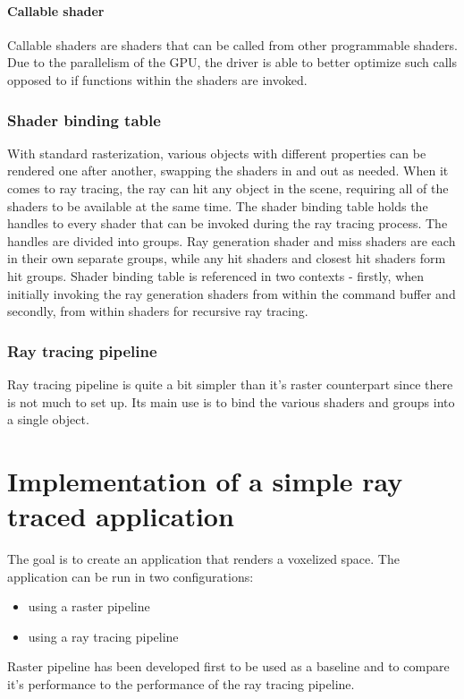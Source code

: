 \documentclass[times, utf8, zavrsni, numeric]{fer}
\begin{document}
\subsubsection{Callable shader}
Callable shaders are shaders that can be called from other programmable shaders. Due to the parallelism of the GPU, the driver is able to better optimize such calls opposed to if functions within the shaders are invoked.

\subsection{Shader binding table}
With standard rasterization, various objects with different properties can be rendered one after another, swapping the shaders in and out as needed. When it comes to ray tracing, the ray can hit any object in the scene, requiring all of the shaders to be available at the same time. The shader binding table holds the handles to every shader that can be invoked during the ray tracing process. The handles are divided into groups. Ray generation shader and miss shaders are each in their own separate groups, while any hit shaders and closest hit shaders form hit groups. Shader binding table is referenced in two contexts - firstly, when initially invoking the ray generation shaders from within the command buffer and secondly, from within shaders for recursive ray tracing.

\subsection{Ray tracing pipeline}
Ray tracing pipeline is quite a bit simpler than it's raster counterpart since there is not much to set up. Its main use is to bind the various shaders and groups into a single object.


\chapter{Implementation of a simple ray traced application}
The goal is to create an application that renders a voxelized space. The application can be run in two configurations:
\begin{itemize}
	\item using a raster pipeline
	\item using a ray tracing pipeline
\end{itemize}

Raster pipeline has been developed first to be used as a baseline and to compare it's performance to the performance of the ray tracing pipeline.
\end{document}
